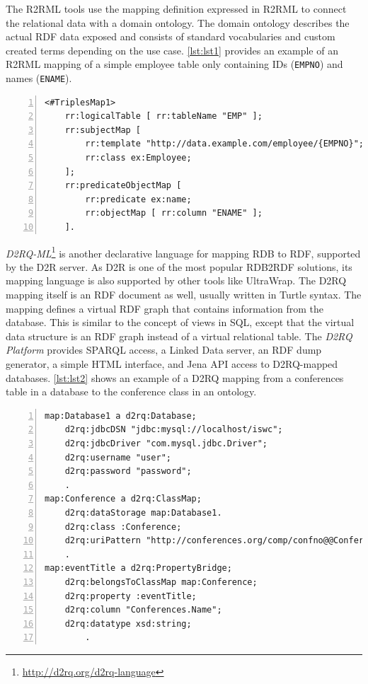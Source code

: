 The R2RML tools use the mapping definition expressed in R2RML to connect the relational data with a domain ontology.
The domain ontology describes the actual RDF data exposed and consists of standard vocabularies and custom created terms depending on the use case.
\autoref{lst:lst1} provides an example of an R2RML mapping of a simple employee table only containing IDs (\verb|EMPNO|) and names (\verb|ENAME|).

\begin{lstlisting}[label=lst:lst1, style=rdf,numbers=left, numberstyle=\tiny, caption=Example of an R2RML mapping.]
<#TriplesMap1>
    rr:logicalTable [ rr:tableName "EMP" ];
    rr:subjectMap [
        rr:template "http://data.example.com/employee/{EMPNO}";
        rr:class ex:Employee;
    ];
    rr:predicateObjectMap [
        rr:predicate ex:name;
        rr:objectMap [ rr:column "ENAME" ];
    ].
\end{lstlisting}


\emph{D2RQ-ML}\footnote{\url{http://d2rq.org/d2rq-language}} is another declarative language for mapping RDB to RDF, supported by the D2R server.
As D2R is one of the most popular RDB2RDF solutions, its mapping language is also supported by other tools like UltraWrap.
The D2RQ mapping itself is an RDF document as well, usually written in Turtle syntax.
The mapping defines a virtual RDF graph that contains information from the database.
This is similar to the concept of views in SQL, except that the virtual data structure is an RDF graph instead of a virtual relational table.
The \emph{D2RQ Platform} provides SPARQL access, a Linked Data server, an RDF dump generator, a simple HTML interface, and Jena API access to D2RQ-mapped databases.
\autoref{lst:lst2} shows an example of a D2RQ mapping from a conferences table in a database to the conference class in an ontology.

\begin{lstlisting}[label=lst:lst2, style=rdf,numbers=left, numberstyle=\tiny, caption = D2RQ map for conferences.]
map:Database1 a d2rq:Database;
    d2rq:jdbcDSN "jdbc:mysql://localhost/iswc";
    d2rq:jdbcDriver "com.mysql.jdbc.Driver";
    d2rq:username "user";
    d2rq:password "password";
    .
map:Conference a d2rq:ClassMap;
    d2rq:dataStorage map:Database1.
    d2rq:class :Conference;
    d2rq:uriPattern "http://conferences.org/comp/confno@@Conferences.ConfID@@";
    .
map:eventTitle a d2rq:PropertyBridge;
    d2rq:belongsToClassMap map:Conference;
    d2rq:property :eventTitle;
    d2rq:column "Conferences.Name";
    d2rq:datatype xsd:string;
        .
\end{lstlisting}


